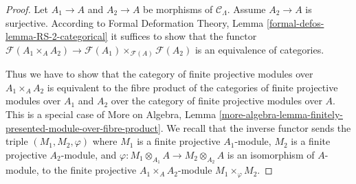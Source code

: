 \documentclass[10pt,a4paper]{amsart}
\theoremstyle{plain}
\theoremstyle{definition}
\theoremstyle{remark}
\numberwithin{equation}{subsection}
\begin{document}
\begin{proof}
Let $A_1 \to A$ and $A_2 \to A$ be morphisms of $\mathcal{C}_\Lambda$.
Assume $A_2 \to A$ is surjective. According to
Formal Deformation Theory, Lemma
\ref{formal-defos-lemma-RS-2-categorical}
it suffices to show that the functor
$\mathcal{F}(A_1 \times_A A_2) \to
\mathcal{F}(A_1) \times_{\mathcal{F}(A)} \mathcal{F}(A_2)$
is an equivalence of categories.

\medskip\noindent
Thus we have to show that the category of finite projective modules
over $A_1 \times_A A_2$ is equivalent to the fibre product
of the categories of finite projective modules over $A_1$ and $A_2$
over the category of finite projective modules over $A$.
This is a special case of More on Algebra, Lemma
\ref{more-algebra-lemma-finitely-presented-module-over-fibre-product}.
We recall that the inverse functor sends the triple
$(M_1, M_2, \varphi)$ where
$M_1$ is a finite projective $A_1$-module,
$M_2$ is a finite projective $A_2$-module, and
$\varphi : M_1 \otimes_{A_1} A \to M_2 \otimes_{A_2} A$
is an isomorphism of $A$-module, to the finite projective
$A_1 \times_A A_2$-module $M_1 \times_\varphi M_2$.
\end{proof}
\end{document}
